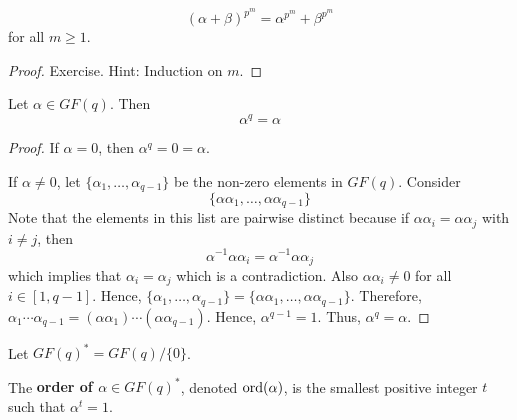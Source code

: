\begin{thmbox}
    \begin{corollary}
        \[ (\alpha+\beta)^{p^m}=\alpha^{p^m}+\beta^{p^m} \]
        for all $ m\geqslant 1 $.
    \end{corollary}
\end{thmbox}

\begin{proof}
    Exercise. Hint: Induction on $ m $.
\end{proof}

\begin{thmbox}
    \begin{theorem}
        Let $ \alpha\in GF(q) $. Then
        \[ \alpha^q=\alpha \]
    \end{theorem}
\end{thmbox}

\begin{proof}
    If $ \alpha=0 $, then $ \alpha^q=0=\alpha $.

    If $ \alpha\neq 0 $, let $ \{\alpha_1,\ldots ,\alpha_{q-1}\} $ be the
    non-zero elements in $ GF(q) $. Consider
    \[ \{\alpha\alpha_1,\ldots,\alpha\alpha_{q-1}\} \]
    Note that the elements in this list are pairwise distinct because if
    $ \alpha\alpha_i=\alpha\alpha_j $ with $ i\neq j $, then
    \[ \alpha^{-1}\alpha\alpha_i=\alpha^{-1}\alpha\alpha_j \]
    which implies that $ \alpha_i=\alpha_j $ which is a contradiction.
    Also $ \alpha\alpha_i\neq 0 $ for all $ i\in [1,q-1] $.
    Hence, $ \{\alpha_1,\ldots ,\alpha_{q-1}\}=\{\alpha\alpha_1,\ldots ,\alpha\alpha_{q-1}\} $.
    Therefore, $ \alpha_1\cdots\alpha_{q-1}=(\alpha\alpha_1)\cdots(\alpha\alpha_{q-1}) $.
    Hence, $ \alpha^{q-1}=1 $. Thus, $ \alpha^q=\alpha $.
\end{proof}

\begin{defbox}
    \begin{definition}
        Let $ GF(q)^*=GF(q)/\{0\} $.
    \end{definition}
\end{defbox}

\begin{defbox}
    \begin{definition}
        The \textbf{order of $\alpha\in GF(q)^*$}, denoted
        $ \operatorname{ord}(\alpha) $, is the smallest positive integer $ t $ such that
        $ \alpha^t=1 $.
    \end{definition}
\end{defbox}

